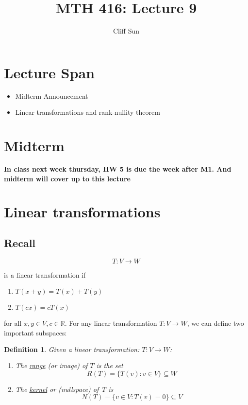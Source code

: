\documentclass{article}
\title{MTH 416: Lecture 9}
\author{Cliff Sun}
\newtheorem{definition}[theorem]{Definition}
\newtheorem{one minute paper}[theorem]{One Minute Paper}
\begin{document}
\maketitle

\section*{Lecture Span}
\begin{itemize}
    \item Midterm Announcement
    \item Linear transformations and rank-nullity theorem
\end{itemize}

\section*{Midterm}

\textbf{In class next week thursday, HW 5 is due the week after M1. And midterm will cover up to this lecture}

\section*{Linear transformations}

\subsection*{Recall}

\begin{equation}
    T: V \rightarrow W
\end{equation}

is a linear transformation if 

\begin{enumerate}
    \item $T(x+y) = T(x) + T(y)$
    \item $T(cx) = cT(x)$
\end{enumerate}

for all $x,y \in V, c \in \mathbb{R}$. For any linear transformation $T: V \rightarrow W$, we can define two important subspaces:

\begin{definition}
    Given a linear transformation: $T: V \rightarrow W$:
    \begin{enumerate}
        \item The \underline{range} (or image) of $T$ is the set
        \begin{equation}
            R(T) = \{T(v): v \in V\} \subseteq W
        \end{equation}
        \item The \underline{kernel} or (nullspace) of T is 
        \begin{equation}
            N(T) = \{v \in V: T(v) = 0\} \subseteq V
        \end{equation}
    \end{enumerate}
\end{definition}
\end{document}

